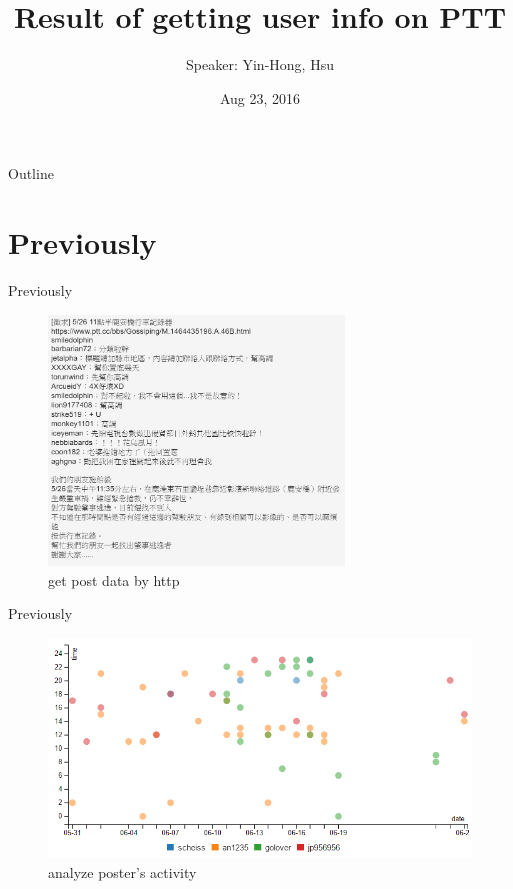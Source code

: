 \documentclass{beamer}
\title {
    Result of getting user info on PTT
}
\author {
    Speaker: Yin-Hong, Hsu
}
\date {
    Aug 23, 2016 %
}
\begin{document}
\begin{frame}
    \titlepage
\end{frame}

\begin{frame}{Outline}
    \tableofcontentsgather
    \tableofcontents
\end{frame}

\section{Previously}
\begin{frame}{Previously}
\begin{figure}[t]
    \centering
    \includegraphics[width=0.7\textwidth]{figures/format.png}
    \caption{get post data by http}
\end{figure}
\end{frame}

\begin{frame}{Previously}
\begin{figure}[t]
    \centering
    \includegraphics[width=1.0\textwidth]{figures/time.png}
    \caption{ analyze poster's activity }
\end{figure}
\end{frame}
\end{document}
